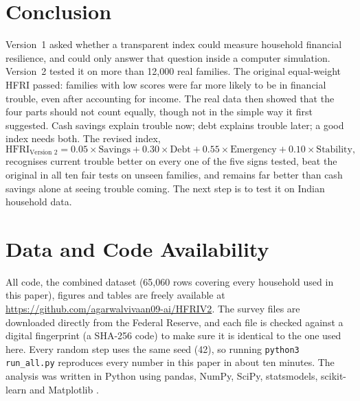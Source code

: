 \documentclass[11pt,a4paper]{article}
\begin{document}
\section{Conclusion}
Version~1 asked whether a transparent index could measure household financial resilience, and could only answer that
question inside a computer simulation. Version~2 tested it on more than 12,000 real families. The original
equal-weight HFRI passed: families with low scores were far more likely to be in financial trouble, even after
accounting for income. The real data then showed that the four parts should not count equally, though not in the simple
way it first suggested. Cash savings explain trouble now; debt explains trouble later; a good index needs both. The
revised index,
\[
\text{HFRI}_{\text{Version 2}} = 0.05\times\text{Savings} + 0.30\times\text{Debt} + 0.55\times\text{Emergency} + 0.10\times\text{Stability},
\]
recognises current trouble better on every one of the five signs tested, beat the original in all ten fair tests on
unseen families, and remains far better than cash savings alone at seeing trouble coming. The next step is to test it
on Indian household data.

\section*{Data and Code Availability}
All code, the combined dataset (65,060 rows covering every household used in this paper), figures and tables are freely
available at \url{https://github.com/agarwalvivaan09-ai/HFRIV2}. The survey files are downloaded directly from the
Federal Reserve, and each file is checked against a digital fingerprint (a SHA-256 code) to make sure it is identical to
the one used here. Every random step uses the same seed (42), so running \texttt{python3 run\_all.py} reproduces every
number in this paper in about ten minutes. The analysis was written in Python using pandas, NumPy, SciPy, statsmodels,
scikit-learn and Matplotlib \cite{pandas,numpy,scipy,statsmodels,sklearn,matplotlib}.
\end{document}
